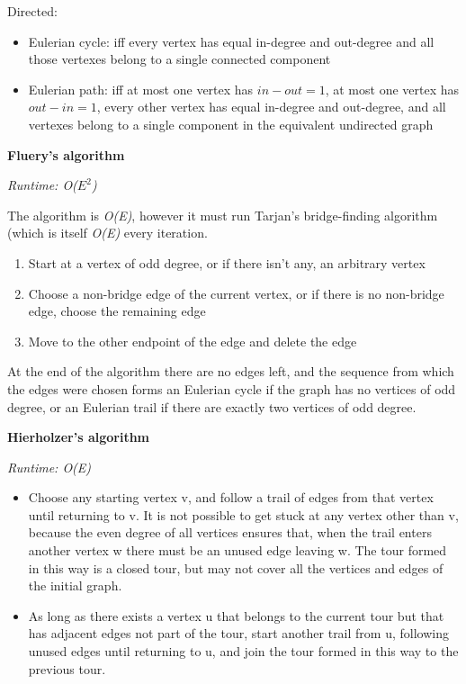 Directed:
\begin{itemize}
    \item Eulerian cycle: iff every vertex has equal in-degree and out-degree and all those vertexes belong to a single connected component
    \item Eulerian path: iff at most one vertex has $in - out = 1$, at most one vertex has $out - in = 1$, every other vertex has equal in-degree and out-degree, and all vertexes belong to a single component in the equivalent undirected graph
\end{itemize}

\textbf{Fluery's algorithm}

\textit{Runtime: O($E^2$)}

The algorithm is \textit{O(E)}, however it must run Tarjan's bridge-finding algorithm (which is itself \textit{O(E)} every iteration.

\begin{enumerate}
    \item Start at a vertex of odd degree, or if there isn't any, an arbitrary vertex
    \item Choose a non-bridge edge of the current vertex, or if there is no non-bridge edge, choose the remaining edge
    \item Move to the other endpoint of the edge and delete the edge
\end{enumerate}

At the end of the algorithm there are no edges left, and the sequence from which the edges were chosen forms an Eulerian cycle if the graph has no vertices of odd degree, or an Eulerian trail if there are exactly two vertices of odd degree.

\textbf{Hierholzer's algorithm}

\textit{Runtime: O(E)}

\begin{itemize}
    \item Choose any starting vertex v, and follow a trail of edges from that vertex until returning to v. It is not possible to get stuck at any vertex other than v, because the even degree of all vertices ensures that, when the trail enters another vertex w there must be an unused edge leaving w. The tour formed in this way is a closed tour, but may not cover all the vertices and edges of the initial graph.
    \item As long as there exists a vertex u that belongs to the current tour but that has adjacent edges not part of the tour, start another trail from u, following unused edges until returning to u, and join the tour formed in this way to the previous tour.
\end{itemize}

